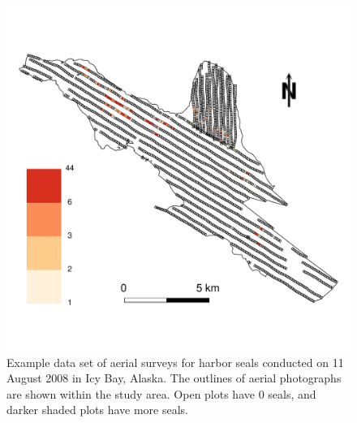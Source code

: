 \documentclass[12pt, titlepage]{article}\usepackage[]{graphicx}\usepackage[]{color}
\begin{document}
	\begin{figure}[H]
	\begin{center}
	\includegraphics[width=450pt]{figure/studyArea.pdf}
	\end{center}
	\caption{Example data set of aerial surveys for harbor seals conducted on 11 August 2008 in Icy Bay, Alaska. The outlines of aerial photographs are shown within the study area. Open plots have 0 seals, and darker shaded plots have more seals.  \label{fig:studyArea}}
	\end{figure}

\end{document}
